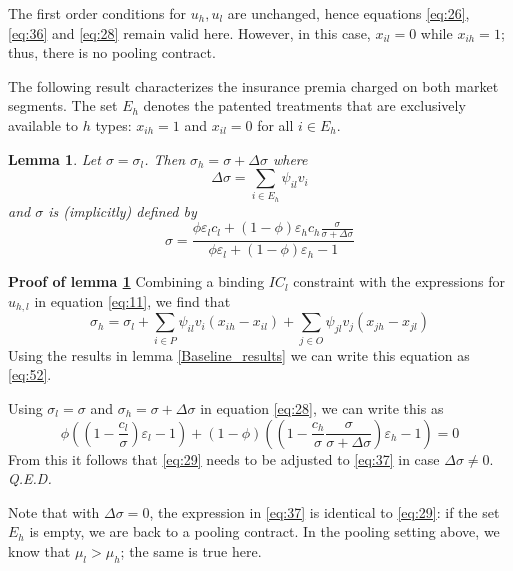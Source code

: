 \documentclass[a4paper,12pt]{article}
\newtheorem{lemma}{Lemma}
\newcommand{\qed}{\hspace*{\fill} {\em Q.E.D.}}
\begin{document}
The first order conditions for \(u_h,u_l\) are unchanged, hence equations \eqref{eq:26}, \eqref{eq:36} and \eqref{eq:28} remain valid here. However, in this case, \(x_{il}=0\) while \(x_{ih}=1\); thus, there is no pooling contract.

The following result characterizes the insurance premia charged on both market segments. The set \(E_h\) denotes the patented treatments that are exclusively available to \(h\) types: \(x_{ih}=1\) and \(x_{il}=0\) for all \(i \in E_h\).

\begin{lemma}
\label{Linear_pricing_premium}
Let \(\sigma=\sigma_l\). Then \(\sigma_h=\sigma+\Delta \sigma\) where
\begin{equation}
\label{eq:52}
\Delta \sigma = \sum_{i \in E_h} \psi_{il} v_i
\end{equation}
and \(\sigma\) is (implicitly) defined by
\begin{equation}
\label{eq:37}
\sigma = \frac{\phi \varepsilon_l c_l +(1-\phi) \varepsilon_h c_h \frac{\sigma}{\sigma + \Delta \sigma} }{\phi \varepsilon_l +(1-\phi) \varepsilon_h-1}
\end{equation}
\end{lemma}

\textbf{Proof of lemma \ref{Linear_pricing_premium}}
Combining a binding \(IC_l\) constraint with the expressions for \(u_{h,l}\) in equation \eqref{eq:11}, we find that
\begin{equation}
\label{eq:53}
\sigma_h = \sigma_l + \sum_{i \in P} \psi_{il}v_i (x_{ih}-x_{il}) + \sum_{j \in O} \psi_{jl} v_j (x_{jh}-x_{jl})
\end{equation}
Using the results in lemma \ref{Baseline_results} we can write this equation as \eqref{eq:52}.

Using \(\sigma_l=\sigma\) and \(\sigma_h=\sigma+\Delta\sigma\) in equation \eqref{eq:28}, we can write this as
\begin{equation}
\label{eq:54}
\phi \left( (1 -\frac{c_l}{\sigma})\varepsilon_l -1 \right) + (1-\phi) \left( (1 - \frac{c_h}{\sigma} \frac{\sigma}{\sigma + \Delta \sigma}) \varepsilon_h -1  \right) = 0
\end{equation}
From this it follows that \eqref{eq:29} needs to be adjusted to \eqref{eq:37} in case \(\Delta \sigma \neq 0\). 
 \qed


Note that with \(\Delta \sigma =0\), the expression in \eqref{eq:37} is identical to \eqref{eq:29}: if the set \(E_h\) is empty, we are back to a pooling contract. In the pooling setting above, we know that \(\mu_l>\mu_h\); the same is true here.
\end{document}
